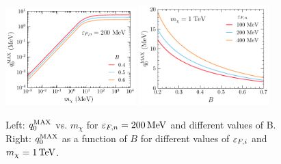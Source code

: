 \begin{figure}[t!bp]
    \centering
    \includegraphics[width = 0.45\textwidth]{capture_1/q0max_mdm.pdf}
    \includegraphics[width = 0.45\textwidth]{capture_1/q0max_B.pdf}

    \caption{Left: $q_0^{\rm MAX}$ vs. $m_\chi$ for $\varepsilon_{F,n}=200{\rm \,MeV}$ and different values of B. 
    Right: $q_0^{\rm MAX}$ as a function of $B$ for different values of $\varepsilon_{F,i}$ and $m_\chi=1{\rm \,TeV}$.}
    \label{ch3:fig:q0max}
\end{figure}

